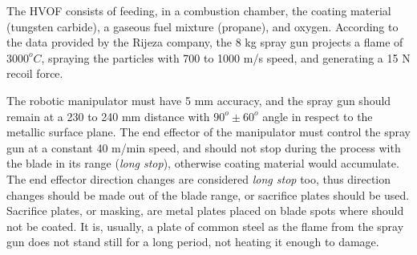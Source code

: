 The HVOF consists of feeding, in a combustion chamber, the coating material
(tungsten carbide), a gaseous fuel mixture (propane), and oxygen. According to
the data provided by the Rijeza company, the 8 kg spray gun projects a flame of
$3000^oC$, spraying the particles with 700 to 1000 m/s speed, and generating a
15 N recoil force.

The robotic manipulator must have 5 mm accuracy, and the spray gun should remain
at a 230 to 240 mm distance with $90^o\pm 60^o$ angle in respect to the metallic
surface plane. The end effector of the manipulator must control the spray
gun at a constant 40 m/min speed, and should not stop during the process with
the blade in its range (\textit{long stop}), otherwise coating material would
accumulate.
The end effector direction changes are considered \textit{long stop} too, thus
direction changes should be made out of the blade range, or sacrifice plates
should be used. Sacrifice plates, or masking, are metal plates placed on blade
spots where should not be coated. It is, usually, a plate of common steel as the
flame from the spray gun does not stand still for a long period, not heating it
enough to damage. 

